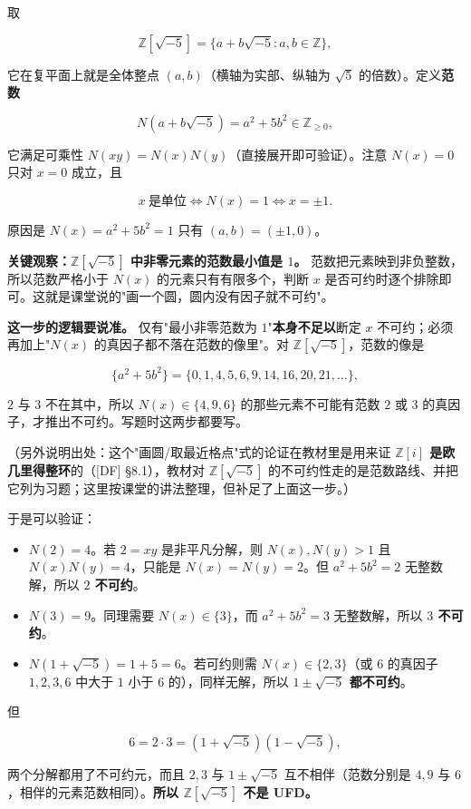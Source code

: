 取

\[
\mathbb Z[\sqrt{-5}]=\{a+b\sqrt{-5}:a,b\in\mathbb Z\},
\]

它在复平面上就是全体整点 $(a,b)$（横轴为实部、纵轴为 $\sqrt5$ 的倍数）。定义\textbf{范数}

\[
N(a+b\sqrt{-5})=a^2+5b^2\in\mathbb Z_{\ge0},
\]

它满足可乘性 $N(xy)=N(x)N(y)$（直接展开即可验证）。注意 $N(x)=0$ 只对 $x=0$ 成立，且

\[
x\ \text{是单位}\iff N(x)=1\iff x=\pm1 .
\]

原因是 $N(x)=a^2+5b^2=1$ 只有 $(a,b)=(\pm1,0)$。

\textbf{关键观察：$\mathbb Z[\sqrt{-5}]$ 中非零元素的范数最小值是 $1$。} 范数把元素映到非负整数，所以范数严格小于 $N(x)$ 的元素只有有限多个，判断 $x$ 是否可约时逐个排除即可。这就是课堂说的"画一个圆，圆内没有因子就不可约"。

\textbf{这一步的逻辑要说准。} 仅有"最小非零范数为 $1$"\textbf{本身不足以}断定 $x$ 不可约；必须再加上"$N(x)$ 的真因子都不落在范数的像里"。对 $\mathbb Z[\sqrt{-5}]$，范数的像是

\[
\{a^2+5b^2\}=\{0,1,4,5,6,9,14,16,20,21,\dots\},
\]

$2$ 与 $3$ 不在其中，所以 $N(x)\in\{4,9,6\}$ 的那些元素不可能有范数 $2$ 或 $3$ 的真因子，才推出不可约。写题时这两步都要写。

（另外说明出处：这个"画圆/取最近格点"式的论证在教材里是用来证 \textbf{$\mathbb Z[i]$ 是欧几里得整环}的（[DF] §8.1），教材对 $\mathbb Z[\sqrt{-5}]$ 的不可约性走的是范数路线、并把它列为习题；这里按课堂的讲法整理，但补足了上面这一步。）

于是可以验证：

\begin{itemize}
\item $N(2)=4$。若 $2=xy$ 是非平凡分解，则 $N(x),N(y)>1$ 且 $N(x)N(y)=4$，只能是 $N(x)=N(y)=2$。但 $a^2+5b^2=2$ 无整数解，所以 \textbf{$2$ 不可约}。
\item $N(3)=9$。同理需要 $N(x)\in\{3\}$，而 $a^2+5b^2=3$ 无整数解，所以 \textbf{$3$ 不可约}。
\item $N(1+\sqrt{-5})=1+5=6$。若可约则需 $N(x)\in\{2,3\}$（或 $6$ 的真因子 $1,2,3,6$ 中大于 $1$ 小于 $6$ 的），同样无解，所以 \textbf{$1\pm\sqrt{-5}$ 都不可约}。
\end{itemize}


但

\[
6=2\cdot3=(1+\sqrt{-5})(1-\sqrt{-5}),
\]

两个分解都用了不可约元，而且 $2,3$ 与 $1\pm\sqrt{-5}$ 互不相伴（范数分别是 $4,9$ 与 $6$，相伴的元素范数相同）。\textbf{所以 $\mathbb Z[\sqrt{-5}]$ 不是 UFD。}

